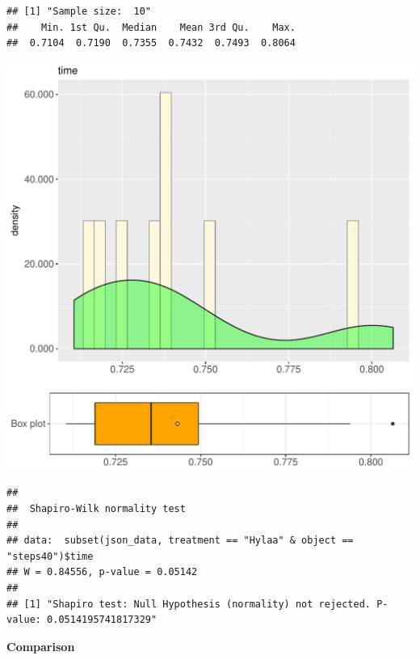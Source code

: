 \documentclass{article}\usepackage[]{graphicx}\usepackage[]{color}
\makeatletter
\def\maxwidth{ %
  \ifdim\Gin@nat@width>\linewidth
    \linewidth
  \else
    \Gin@nat@width
  \fi
}
\newenvironment{kframe}{%
 \def\at@end@of@kframe{}%
 \ifinner\ifhmode%
  \def\at@end@of@kframe{\end{minipage}}%
  \begin{minipage}{\columnwidth}%
 \fi\fi%
 \def\FrameCommand##1{\hskip\@totalleftmargin \hskip-\fboxsep
 \colorbox{shadecolor}{##1}\hskip-\fboxsep
     \hskip-\linewidth \hskip-\@totalleftmargin \hskip\columnwidth}%
 \MakeFramed {\advance\hsize-\width
   \@totalleftmargin\z@ \linewidth\hsize
   \@setminipage}}%
 {\par\unskip\endMakeFramed%
 \at@end@of@kframe}
\newenvironment{knitrout}{}{} %
\makeatother
\begin{document}
\begin{knitrout}
\color{fgcolor}\begin{kframe}
\begin{verbatim}
## [1] "Sample size:  10"
##    Min. 1st Qu.  Median    Mean 3rd Qu.    Max. 
##  0.7104  0.7190  0.7355  0.7432  0.7493  0.8064
\end{verbatim}
\end{kframe}
\includegraphics[width=\maxwidth]{figure/RH3_Hylaa_steps40-1} 
\begin{kframe}\begin{verbatim}
## 
## 	Shapiro-Wilk normality test
## 
## data:  subset(json_data, treatment == "Hylaa" & object == "steps40")$time
## W = 0.84556, p-value = 0.05142
## 
## [1] "Shapiro test: Null Hypothesis (normality) not rejected. P-value: 0.0514195741817329"
\end{verbatim}
\end{kframe}
\end{knitrout}
  
 \textbf{Comparison}
  
\end{document}
